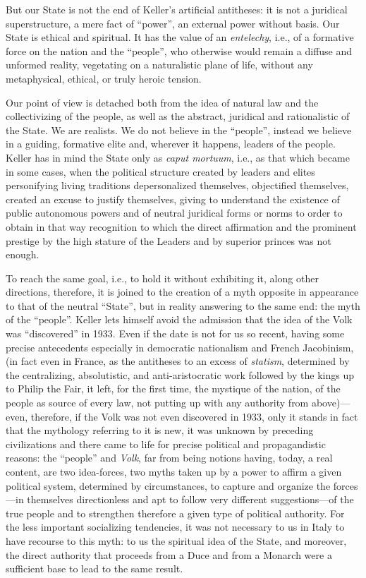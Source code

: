 But our State is not the end of Keller's artificial antitheses: it is not a juridical superstructure, a mere fact of ``power'', an external power without basis. Our State is ethical and spiritual. It has the value of an \emph{entelechy}, i.e., of a formative force on the nation and the ``people'', who otherwise would remain a diffuse and unformed reality, vegetating on a naturalistic plane of life, without any metaphysical, ethical, or truly heroic tension.

Our point of view is detached both from the idea of natural law and the collectivizing of the people, as well as the abstract, juridical and rationalistic of the State. We are realists. We do not believe in the ``people'', instead we believe in a guiding, formative elite and, wherever it happens, leaders of the people. Keller has in mind the State only as \emph{caput mortuum}, i.e., as that which became in some cases, when the political structure created by leaders and elites personifying living traditions depersonalized themselves, objectified themselves, created an excuse to justify themselves, giving to understand the existence of public autonomous powers and of neutral juridical forms or norms to order to obtain in that way recognition to which the direct affirmation and the prominent prestige by the high stature of the Leaders and by superior princes was not enough.

To reach the same goal, i.e., to hold it without exhibiting it, along other directions, therefore, it is joined to the creation of a myth opposite in appearance to that of the neutral ``State'', but in reality answering to the same end: the myth of the ``people''. Keller lets himself avoid the admission that the idea of the Volk was ``discovered'' in 1933. Even if the date is not for us so recent, having some precise antecedents especially in democratic nationalism and French Jacobinism, (in fact even in France, as the antitheses to an excess of \emph{statism}, determined by the centralizing, absolutistic, and anti-aristocratic work followed by the kings up to Philip the Fair, it left, for the first time, the mystique of the nation, of the people as source of every law, not putting up with any authority from above)---even, therefore, if the Volk was not even discovered in 1933, only it stands in fact that the mythology referring to it is new, it was unknown by preceding civilizations and there came to life for precise political and propagandistic reasons: the ``people'' and \emph{Volk}, far from being notions having, today, a real content, are two idea-forces, two myths taken up by a power to affirm a given political system, determined by circumstances, to capture and organize the forces---in themselves directionless and apt to follow very different suggestions---of the true people and to strengthen therefore a given type of political authority. For the less important socializing tendencies, it was not necessary to us in Italy to have recourse to this myth: to us the spiritual idea of the State, and moreover, the direct authority that proceeds from a Duce and from a Monarch were a sufficient base to lead to the same result.

